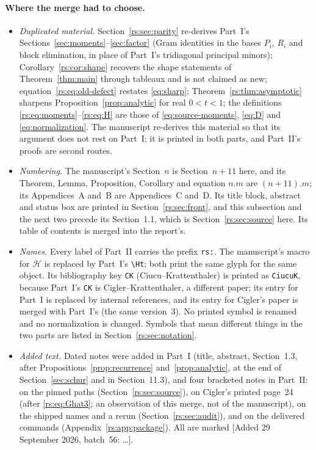 \documentclass[11pt]{article}
\theoremstyle{definition}
\theoremstyle{remark}
\newcommand{\Ht}{\mathcal H}
\theoremstyle{definition}
\theoremstyle{plain}
\numberwithin{equation}{section}
\begin{document}
\paragraph{Where the merge had to choose.}
\begin{itemize}
\item \emph{Duplicated material.} Section~\ref{rs:sec:parity} re-derives
Part~I's Sections~\ref{sec:moments}--\ref{sec:factor} (Gram identities in
the bases $P_i$, $R_i$ and block elimination, in place of Part~I's
tridiagonal principal minors); Corollary~\ref{rs:cor:shape} recovers the
shape statements of Theorem~\ref{thm:main} through tableaux and is not
claimed as new; equation~\eqref{rs:eq:old-defect} restates
\eqref{eq:sharp}; Theorem~\ref{rs:thm:asymptotic} sharpens
Proposition~\ref{prop:analytic} for real $0<t<1$; the definitions
\eqref{rs:eq:moments}--\eqref{rs:eq:H} are those of
\eqref{eq:source-moments}, \eqref{eq:D} and \eqref{eq:normalization}. The
manuscript re-derives this material so that its argument does not rest on
Part~I; it is printed in both parts, and Part~II's proofs are second routes.
\item \emph{Numbering.} The manuscript's Section~$n$ is Section~$n+11$ here,
and its Theorem, Lemma, Proposition, Corollary and equation $n.m$ are
$(n+11).m$; its Appendices~A and~B are Appendices~C and~D. Its title block,
abstract and status box are printed in Section~\ref{rs:sec:front}, and this
subsection and the next two precede its Section~1.1, which is
Section~\ref{rs:sec:source} here. Its table of contents is merged into the
report's.
\item \emph{Names.} Every label of Part~II carries the prefix
\texttt{rs:}. The manuscript's macro for $\Ht$ is replaced by Part~I's
\verb|\Ht|; both print the same glyph for the same object. Its bibliography
key \texttt{CK} (Ciucu--Krattenthaler) is printed as \texttt{CiucuK},
because Part~I's \texttt{CK} is Cigler--Krattenthaler, a different paper;
its entry for Part~I is replaced by internal references, and its entry for
Cigler's paper is merged with Part~I's (the same version~3). No printed
symbol is renamed and no normalization is changed. Symbols that mean
different things in the two parts are listed in
Section~\ref{rs:sec:notation}.
\item \emph{Added text.} Dated notes were added in Part~I (title, abstract,
Section~1.3, after Propositions~\ref{prop:recurrence}
and~\ref{prop:analytic}, at the end of Section~\ref{sec:schur} and in
Section~11.3), and four bracketed notes in Part~II: on the pinned paths
(Section~\ref{rs:sec:source}), on Cigler's printed page~24 (after
\eqref{rs:eq:Ghat3}; an observation of this merge, not of the manuscript),
on the shipped names and a rerun (Section~\ref{rs:sec:audit}), and on the
delivered commands (Appendix~\ref{rs:app:package}). All are marked
\textup{[Added 29 September 2026, batch~56: \dots]}.
\end{itemize}
\end{document}
